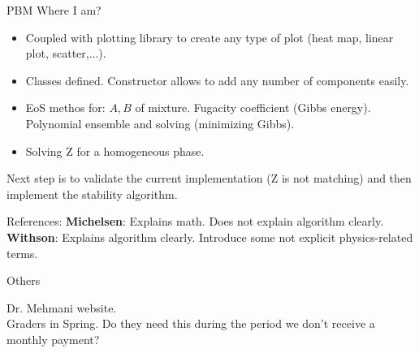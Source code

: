 \documentclass{beamer}
\begin{document}
	\begin{frame}{PBM}
		Where I am?
		\begin{itemize}
			\item Coupled with plotting library to create any type of plot (heat map, linear plot, scatter,...).
			\item Classes defined. Constructor allows to add any number of components easily.
			\item EoS methos for: $A,B$ of mixture. Fugacity coefficient (Gibbs energy). Polynomial ensemble and solving (minimizing Gibbs).
			\item Solving Z for a homogeneous phase.
		\end{itemize}
		Next step is to validate the current implementation (Z is not matching) and then implement the stability algorithm.
		\begin{block}{References:}
			\textbf{Michelsen}: Explains math. Does not explain algorithm clearly.
			\textbf{Withson}: Explains algorithm clearly.  Introduce some not explicit physics-related terms. 
		\end{block}
	\end{frame}

	\begin{frame}{Others}
		
		Dr. Mehmani website.\\
		Graders in Spring. Do they need this during the period we don't receive a monthly payment?\\
	\end{frame}
\end{document}
